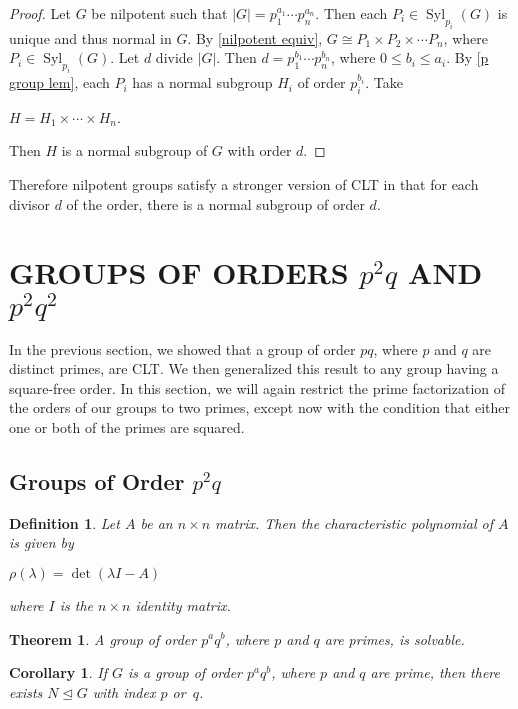 \documentclass[12pt]{report}
\theoremstyle{newthm}
\newtheorem{Theorem}[lem]{Theorem}
\newtheorem{Definition}[lem]{Definition}
\newtheorem{Corollary}[lem]{Corollary}
\DeclareMathOperator{\Syl}{Syl}
\begin{document}
\begin{proof}
Let $G$ be nilpotent such that $|G|=p_1^{a_1}\dotsi p_n^{a_n}$. Then each $P_i\in\Syl_{p_i}(G)$ is unique and thus normal in $G$. By \cref{nilpotent equiv}, $G\cong P_1\times P_2\times\dotsi P_n$, where $P_i\in \Syl_{p_i}(G)$. Let $d$ divide $|G|$. Then $d=p_1^{b_1}\dotsi p_n^{b_n}$, where $0\leq b_i\leq a_i$. By \cref{p group lem}, each $P_i$ has a normal subgroup $H_i$ of order $p_i^{b_i}.$ Take \begin{center}$H=H_1\times\dotsi\times H_n$.\end{center} Then $H$ is a normal subgroup of $G$ with order $d$.
\end{proof}

Therefore nilpotent groups satisfy a stronger version of CLT in that for each divisor $d$ of the order, there is a normal subgroup of order $d$.

\newpage


\section{GROUPS OF ORDERS $p^2q$ AND $p^2q^2$}

In the previous section, we showed that a group of order $pq$, where $p$ and $q$ are distinct primes, are CLT. We then generalized this result to any group having a square-free order. In this section, we will again restrict the prime factorization of the orders of our groups to two primes, except now with the condition that either one or both of the primes are squared.

\subsection{Groups of Order $p^2q$}
\begin{Definition} Let $A$ be an $n\times n$ matrix. Then the \textit{characteristic polynomial} of $A$ is given by  \begin{center}
$\rho(\lambda)=\det(\lambda I - A)$
\end{center} where $I$ is the $n\times n$ identity matrix.
\end{Definition}
\begin{Theorem}\label{Burnside p^aq^b}\cite[Theorem 9.3.2]{Hall} A group of order $p^aq^b$, where $p$ and $q$ are primes, is solvable. 

\end{Theorem}
\begin{Corollary}\label{p^aq^b} If $G$ is a group of order $p^aq^b$, where $p$ and $q$ are prime, then there exists $N\trianglelefteq G$ with index $p$ or~$q$. 
\end{Corollary}
\end{document}
